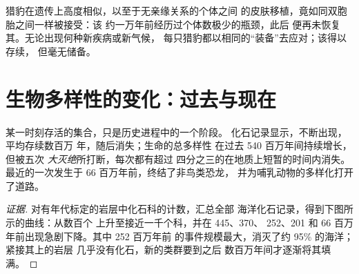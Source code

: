 \begin{example}[几乎没有遗传多样性的物种]\label{ex:g10:biodiversity-scales:cheetah}
猎豹在遗传上高度相似，以至于无亲缘关系的个体之间
的皮肤移植，竟如同双胞胎之间一样被接受：该
约一万年前经历过个体数极少的瓶颈，此后
便再未恢复其。无论出现何种新疾病或新气候，
每只猎豹都以相同的“装备”去应对；该得以存续，
但毫无储备。
\end{example}

\section{生物多样性的变化：过去与现在}

\begin{proposition}\label{prop:g10:biodiversity-scales:changes}
某一时刻存活的集合，只是历史进程中的一个阶段。
化石记录显示，不断出现，平均存续数百万
年，随后消失；生命的总多样性
在过去 540 百万年间持续增长，但被五次
\emph{大灭绝}所打断，每次都有超过
四分之三的在地质上短暂的时间内消失。
最近的一次发生于 66 百万年前，终结了非鸟类恐龙，
并为哺乳动物的多样化打开了道路。
\end{proposition}
\begin{proof}[证据]
对有年代标定的岩层中化石科的计数，汇总全部
海洋化石记录，得到下图所示的曲线：从数百个
上升至接近一千个科，并在 445、370、
252、201 和 66 百万年前出现急剧下降。其中 252 百万年前
的事件规模最大，消灭了约 95\% 的海洋；紧接其上的岩层
几乎没有化石，新的类群要到之后
数百万年间才逐渐将其填满。
\end{proof}

